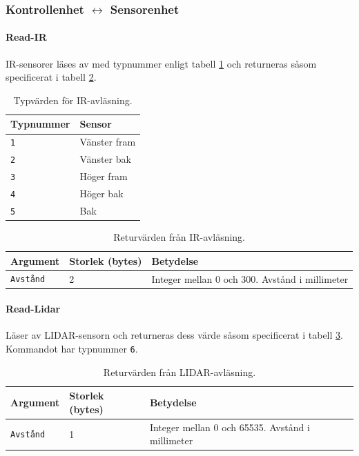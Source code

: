 \documentclass[a4paper,11pt]{article}
\begin{document}
\subsubsection{Kontrollenhet $\leftrightarrow$ Sensorenhet}
\paragraph{Read-IR}
\label{sec:sensorCommunication}
IR-sensorer läses av med typnummer enligt tabell \ref{table:irtypes} och returneras såsom specificerat i tabell \ref{tab:ir}.

\begin{table}[h!]
    \centering
    \begin{tabular}{|l|l|}
    \rowcolor{gray!50}
    	\hline
    \textbf{Typnummer} & \textbf{Sensor} \\ \hline
    \texttt{1} & Vänster fram \\
    \texttt{2} & Vänster bak \\
    \texttt{3} & Höger fram \\
    \texttt{4} & Höger bak  \\
    \texttt{5} & Bak \\ \hline
    \end{tabular}
    \caption{Typvärden för IR-avläsning.}
    \label{table:irtypes}
\end{table}


\begin{table}[h!]
    \centering
    \begin{tabular}{|l|l|l|}
    \rowcolor{gray!50}
    	\hline
    	\textbf{Argument} & \textbf{Storlek (bytes)} & \textbf{Betydelse} \\ \hline
    	\texttt{Avstånd} & 2 & Integer mellan 0 och 300. Avstånd i millimeter \\ \hline
    \end{tabular}
    \caption{Returvärden från IR-avläsning.}
    \label{tab:ir}
\end{table}

\paragraph{Read-Lidar}
Läser av LIDAR-sensorn och returneras dess värde såsom specificerat i tabell \ref{tab:lidar}. Kommandot har typnummer \texttt{6}.
\begin{table}[h!]
    \centering
    \begin{tabular}{|l|l|l|}
    \rowcolor{gray!50}
        \hline
        \textbf{Argument} & \textbf{Storlek (bytes)} & \textbf{Betydelse} \\ \hline
        \texttt{Avstånd} & 1 & Integer mellan 0 och 65535. Avstånd i millimeter \\ \hline
        \end{tabular}
    \caption{Returvärden från LIDAR-avläsning.}
    \label{tab:lidar}
\end{table}
\end{document}
